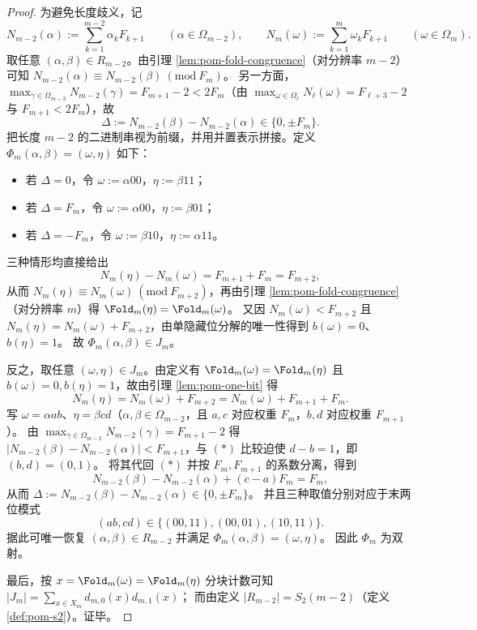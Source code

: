 \begin{proof}
为避免长度歧义，记
\[
N_{m-2}(\alpha):=\sum_{k=1}^{m-2}\alpha_kF_{k+1}\qquad(\alpha\in\Omega_{m-2}),
\qquad
N_m(\omega):=\sum_{k=1}^{m}\omega_kF_{k+1}\qquad(\omega\in\Omega_m).
\]
取任意 \((\alpha,\beta)\in R_{m-2}\)。由引理 \ref{lem:pom-fold-congruence}（对分辨率 \(m-2\)）可知
\(
N_{m-2}(\alpha)\equiv N_{m-2}(\beta)\ (\mathrm{mod}\ F_m)
\)。
另一方面，\(\max_{\gamma\in\Omega_{m-2}}N_{m-2}(\gamma)=F_{m+1}-2<2F_m\)（由 \(\max_{\omega\in\Omega_\ell}N_\ell(\omega)=F_{\ell+3}-2\) 与 \(F_{m+1}<2F_m\)），故
\[
\Delta:=N_{m-2}(\beta)-N_{m-2}(\alpha)\in\{0,\pm F_m\}.
\]
把长度 \(m-2\) 的二进制串视为前缀，并用并置表示拼接。定义 \(\Phi_m(\alpha,\beta)=(\omega,\eta)\) 如下：
\begin{itemize}
\item 若 \(\Delta=0\)，令 \(\omega:=\alpha 00\)，\(\eta:=\beta 11\)；
\item 若 \(\Delta=F_m\)，令 \(\omega:=\alpha 00\)，\(\eta:=\beta 01\)；
\item 若 \(\Delta=-F_m\)，令 \(\omega:=\beta 10\)，\(\eta:=\alpha 11\)。
\end{itemize}
三种情形均直接给出
\[
N_m(\eta)-N_m(\omega)=F_{m+1}+F_m=F_{m+2},
\]
从而 \(N_m(\eta)\equiv N_m(\omega)\ (\mathrm{mod}\ F_{m+2})\)，再由引理 \ref{lem:pom-fold-congruence}（对分辨率 \(m\)）得 \(\Fold_m(\eta)=\Fold_m(\omega)\)。
又因 \(N_m(\omega)<F_{m+2}\) 且 \(N_m(\eta)=N_m(\omega)+F_{m+2}\)，由单隐藏位分解的唯一性得到 \(b(\omega)=0\)、\(b(\eta)=1\)。
故 \(\Phi_m(\alpha,\beta)\in J_m\)。

反之，取任意 \((\omega,\eta)\in J_m\)。由定义有 \(\Fold_m(\omega)=\Fold_m(\eta)\) 且 \(b(\omega)=0,b(\eta)=1\)，故由引理 \ref{lem:pom-one-bit} 得
\[
N_m(\eta)=N_m(\omega)+F_{m+2}=N_m(\omega)+F_{m+1}+F_m.\tag{$\ast$}
\]
写 \(\omega=\alpha ab\)、\(\eta=\beta cd\)（\(\alpha,\beta\in\Omega_{m-2}\)，且 \(a,c\) 对应权重 \(F_m\)，\(b,d\) 对应权重 \(F_{m+1}\)）。
由 \(\max_{\gamma\in\Omega_{m-2}}N_{m-2}(\gamma)=F_{m+1}-2\) 得 \(|N_{m-2}(\beta)-N_{m-2}(\alpha)|<F_{m+1}\)，与 \((\ast)\) 比较迫使 \(d-b=1\)，即 \((b,d)=(0,1)\)。
将其代回 \((\ast)\) 并按 \(F_m,F_{m+1}\) 的系数分离，得到
\[
N_{m-2}(\beta)-N_{m-2}(\alpha) + (c-a)F_m = F_m,
\]
从而 \(\Delta:=N_{m-2}(\beta)-N_{m-2}(\alpha)\in\{0,\pm F_m\}\)。
并且三种取值分别对应于末两位模式
\[
(ab,cd)\in\{(00,11),(00,01),(10,11)\}.
\]
据此可唯一恢复 \((\alpha,\beta)\in R_{m-2}\) 并满足 \(\Phi_m(\alpha,\beta)=(\omega,\eta)\)。
因此 \(\Phi_m\) 为双射。

最后，按 \(x=\Fold_m(\omega)=\Fold_m(\eta)\) 分块计数可知
\(
|J_m|=\sum_{x\in X_m}d_{m,0}(x)d_{m,1}(x)
\)；
而由定义 \(|R_{m-2}|=S_2(m-2)\)（定义 \ref{def:pom-s2}）。证毕。
\end{proof}


